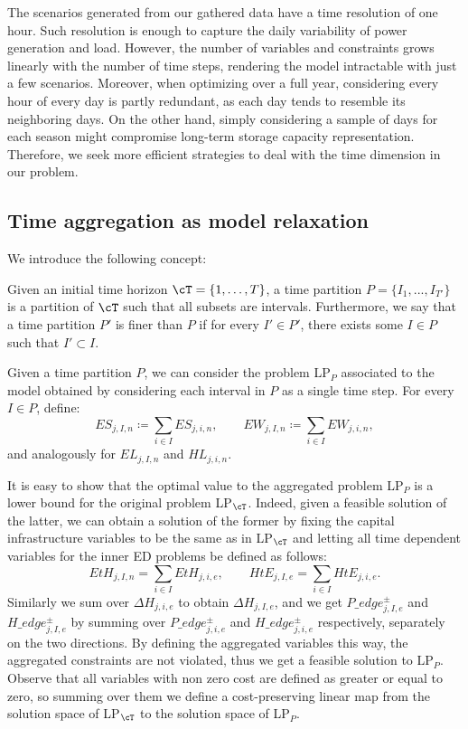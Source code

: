 \documentclass[smallextended,natbib]{svjour3}       %
\numberwithin{definition}{section}
\numberwithin{theorem}{section}
\numberwithin{proposition}{section}
\begin{document}
The scenarios generated from our gathered data have a time resolution of one hour. 
Such resolution is enough to capture the daily variability of power generation and load. 
However, the number of variables and constraints grows linearly with the number of time steps, rendering the model intractable with just a few scenarios.
Moreover, when optimizing over a full year, considering every hour of every day is partly redundant, as each day tends to resemble its neighboring days. 
On the other hand, simply considering a sample of days for each season might compromise long-term storage capacity representation. 
Therefore, we seek more efficient strategies to deal with the time dimension in our problem.

\subsection{Time aggregation as model relaxation}\label{subsection: relax}

We introduce the following concept:
\begin{definition}
Given an initial time horizon \(\cT = \{1, \ldots, T\}\), a time partition \(P=\{I_1,...,I_{T'}\}\) is a partition of \(\cT\) such that all subsets are intervals. 
Furthermore, we say that a time partition \(P'\) is finer than \(P\) if for every \(I' \in P'\), there exists some \(I \in P\) such that \(I' \subset I\).
\end{definition}

Given a time partition $P$, we can consider the problem LP\(_P\) associated to the model obtained by considering each interval in \(P\) as a single time step. 
For every \(I\in P\), define:
\begin{equation}\label{sums scenarios}
ES_{j,I,n} \coloneqq \sum_{i \in I} ES_{j,i,n}, \quad\quad EW_{j,I,n} \coloneqq \sum_{i \in I} EW_{j,i,n}, 
\end{equation}
and analogously for $EL_{j,I,n}$ and $HL_{j,i,n}$.

It is easy to show that the optimal value to the aggregated problem LP\(_P\) is a lower bound for the original problem LP\(_{\cT}\). 
Indeed, given a feasible solution of the latter, we can obtain a solution of the former by fixing the capital infrastructure variables to be the same as in LP\(_{\cT}\) and letting all time dependent variables for the inner ED problems be defined as follows:
\begin{equation}\label{sums var_t}
EtH_{j,I,n} = \sum_{i \in I} EtH_{j,i,e}, \quad\quad HtE_{j,I,e} = \sum_{i \in I} HtE_{j,i,e}.
\end{equation}
Similarly we sum over \(\Delta H_{j,i,e}\) to obtain \(\Delta H_{j,I,e}\), and we get \(P\_edge^\pm_{j,I,e}\) and \(H\_edge^\pm_{j,I,e}\) by summing over \(P\_edge^\pm_{j,i,e}\) and \(H\_edge^\pm_{j,i,e}\) respectively, separately on the two directions.
By defining the aggregated variables this way, the aggregated constraints are not violated, thus we get a feasible solution to LP\(_P\).
Observe that all variables with non zero cost are defined as greater or equal to zero, so summing over them we define a cost-preserving linear map from the solution space of LP\(_{\cT}\) to the solution space of LP\(_P\).
\end{document}
